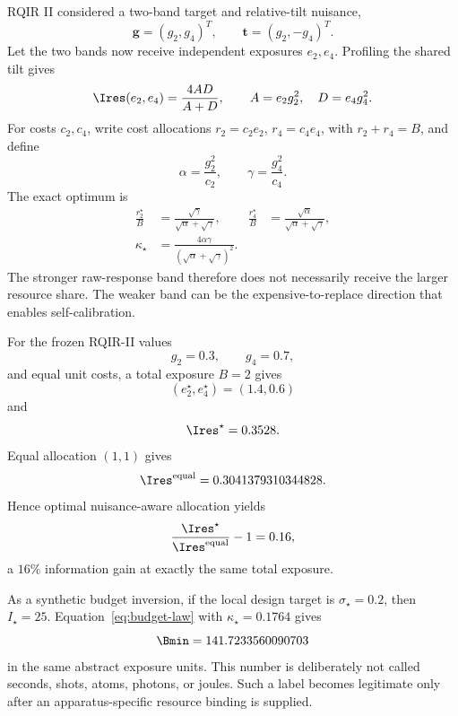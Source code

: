 RQIR II considered a two-band target and relative-tilt nuisance,
\begin{equation}
 \bm g=(g_2,g_4)^T,
 \qquad
 \bm t=(g_2,-g_4)^T.
\end{equation}
Let the two bands now receive independent exposures $e_2,e_4$. Profiling the shared tilt gives
\begin{equation}
 \Ires(e_2,e_4)
 =
 \frac{4A D}{A+D},
 \qquad
 A=e_2g_2^2,\quad D=e_4g_4^2.
\label{eq:weighted-two-band}
\end{equation}
For costs $c_2,c_4$, write cost allocations
$r_2=c_2e_2$, $r_4=c_4e_4$, with $r_2+r_4=B$, and define
\begin{equation}
 \alpha=\frac{g_2^2}{c_2},
 \qquad
 \gamma=\frac{g_4^2}{c_4}.
\end{equation}
The exact optimum is
\begin{align}
 \frac{r_2^\star}{B}
 &=\frac{\sqrt{\gamma}}{\sqrt{\alpha}+\sqrt{\gamma}},
 &
 \frac{r_4^\star}{B}
 &=\frac{\sqrt{\alpha}}{\sqrt{\alpha}+\sqrt{\gamma}},
\label{eq:cost-fractions}\\
 \kappa_\star
 &=\frac{4\alpha\gamma}
 {(\sqrt{\alpha}+\sqrt{\gamma})^2}.
\label{eq:two-band-kappa}
\end{align}
The stronger raw-response band therefore does not necessarily receive the larger resource share. The weaker band can be the expensive-to-replace direction that enables self-calibration.

For the frozen RQIR-II values
\begin{equation}
 g_2=0.3,\qquad g_4=0.7,
\end{equation}
and equal unit costs, a total exposure $B=2$ gives
\begin{equation}
 (e_2^\star,e_4^\star)=(1.4,0.6)
\end{equation}
and
\begin{equation}
 \Ires^\star=0.3528.
\end{equation}
Equal allocation $(1,1)$ gives
\begin{equation}
 \Ires^{\rm equal}=0.3041379310344828.
\end{equation}
Hence optimal nuisance-aware allocation yields
\begin{equation}
 \frac{\Ires^\star}{\Ires^{\rm equal}}-1
 =0.16,
\end{equation}
a $16\%$ information gain at exactly the same total exposure.

As a synthetic budget inversion, if the local design target is $\sigma_\star=0.2$, then $I_\star=25$. Equation~\eqref{eq:budget-law} with
$\kappa_\star=0.1764$ gives
\begin{equation}
 \Bmin=141.7233560090703
\end{equation}
in the same abstract exposure units. This number is deliberately not called seconds, shots, atoms, photons, or joules. Such a label becomes legitimate only after an apparatus-specific resource binding is supplied.


